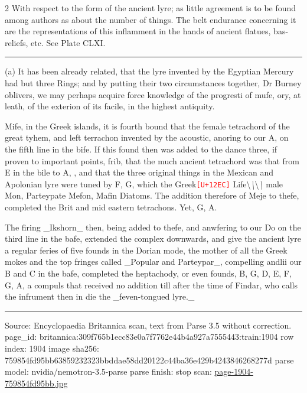 \documentclass[10pt]{article}
\newcommand{\unk}[1]{\textcolor{red}{\texttt{\scriptsize[U+#1]}}}
\begin{document}
\begin{multicols}{2}
With respect to the form of the ancient lyre; as little agreement is to be found among authors as about the number of things. The belt endurance concerning it are the representations of this inflamment in the hands of ancient flatues, bas-reliefs, etc. See Plate CLXI.

\end{multicols}
\par\vspace{4pt}\noindent\rule{0.3\linewidth}{0.4pt}\par
{\footnotesize
(a) It has been already related, that the lyre invented by the Egyptian Mercury had but three Rings; and by putting their two circumstances together, Dr Burney oblivers, we may perhaps acquire force knowledge of the progresti of mufe, ory, at leath, of the exterion of its facile, in the highest antiquity.

Mife, in the Greek islands, it is fourth bound that the female tetrachord of the great tyhem, and left terrachon invented by the acoustic, anoring to our A, on the fifth line in the bife. If this found then was added to the dance three, if proven to important points, frib, that the much ancient tetrachord was that from E in the bile to A, , and that the three original things in the Mexican and Apolonian lyre were tuned by F, G, which the Greek\unk{12EC} Life\textbackslash{}\textit{\textbackslash{}}\textbackslash{}\textit{\textbackslash{}} male Mon, Parteypate Mefon, Mafin Diatoms. The addition therefore of Meje to thefe, completed the Brit and mid eastern tetrachons. Yet, G, A.

The firing \_Ikshorn\_ then, being added to thefe, and anwfering to our Do on the third line in the bafe, extended the complex downwards, and give the ancient lyre a regular feries of five founds in the Dorian mode, the mother of all the Greek mokes and the top fringes called \_Popular and Parteypar\_, compelling andlii our B and C in the bafe, completed the heptachody, or even founds, B, G, D, E, F, G, A, a compuls that received no addition till after the time of Findar, who calls the infrument then in die the \_feven-tongued lyre.\_\par}
\vfill\par\noindent\rule{\linewidth}{0.4pt}\par
{\scriptsize\color{gray}\noindent Source: Encyclopaedia Britannica scan, text from Parse 3.5 without correction. page\_id: britannica:309f765b1ecc83e0a7f7762e44b4a927a7555443:train:1904 \quad row index: 1904 \quad image sha256: 759854fd95bb63859232323bbddae58dd20122c44ba36e429b4243846268277d \quad parse model: nvidia/nemotron-3.5-parse \quad parse finish: stop \quad scan: \href{../scans/page-1904-759854fd95bb.jpg}{page-1904-759854fd95bb.jpg}\par}
\end{document}
